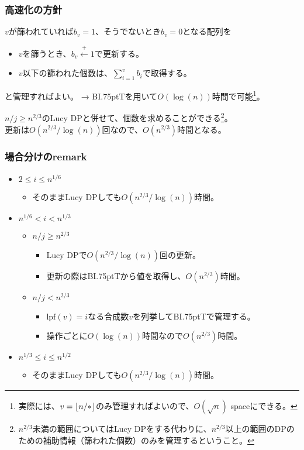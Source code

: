 \documentclass[
  lualatex,
  ja=standard,
  compress,
  hyperref={colorlinks, urlcolor=magenta, linkcolor=blue!55!black},
  dvipsnames,
  svgnames,
]{beamer}
\newcommand{\xgets}[1]{\xleftarrow{#1}}
\newcommand{\lpf}[1]{\mathrm{lpf}(#1)}
\newcommand{\BIT}{BI\kern.75ptT}
\begin{document}
\begin{frame}
  \frametitle{高速化の方針}

  $v$が篩われていれば$b_v = 1$、そうでないとき$b_v = 0$となる配列を
  \begin{itemize}
  \item $v$を篩うとき、$b_v \xgets{+} 1$で更新する。
  \item $v$以下の篩われた個数は、$\sum_{i=1}^v b_i$で取得する。
  \end{itemize}
  と管理すればよい。
  → {\BIT}を用いて$O(\log(n))$時間で可能\footnote{実際には、$v=\lfloor n/*\rfloor$のみ管理すればよいので、$O(\sqrt{n})$ spaceにできる。}。

  $n/j\ge n^{2/3}$のLucy DPと併せて、個数を求めることができる\footnote{$n^{2/3}$未満の範囲についてはLucy DPをする代わりに、$n^{2/3}$以上の範囲のDPのための補助情報（篩われた個数）のみを管理するということ。}。\\

  更新は$O(n^{2/3}/\log(n))$回なので、$O(n^{2/3})$時間となる。
\end{frame}

\begin{frame}
  \frametitle{場合分けのremark}

  \begin{itemize}
  \item $2\le i\le n^{1/6}$
    \begin{itemize}
    \item そのままLucy DPしても$O(n^{2/3}/\log(n))$時間。
    \end{itemize}
  \item $n^{1/6}<i<n^{1/3}$
    \begin{itemize}
    \item $n/j\ge n^{2/3}$
      \begin{itemize}
      \item Lucy DPで$O(n^{2/3}/\log(n))$回の更新。
      \item 更新の際は{\BIT}から値を取得し、\textcolor{con}{$O(n^{2/3})$時間}。
      \end{itemize}
    \item $n/j<n^{2/3}$
      \begin{itemize}
      \item $\lpf{v}=i$なる合成数$v$を列挙して{\BIT}で管理する。
      \item 操作ごとに$O(\log(n))$時間なので\textcolor{con}{$O(n^{2/3})$時間}。
      \end{itemize}
    \end{itemize}
  \item $n^{1/3}\le i\le n^{1/2}$
    \begin{itemize}
    \item そのままLucy DPしても$O(n^{2/3}/\log(n))$時間。
    \end{itemize}
  \end{itemize}
\end{frame}
\end{document}
